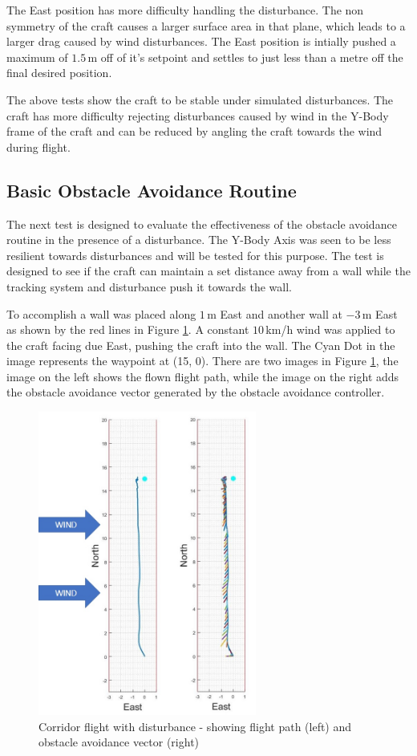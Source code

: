 		The East position has more difficulty handling the disturbance. The non symmetry of the craft causes a larger surface area in that plane, which leads to a larger drag caused by wind disturbances. The East position is intially pushed a maximum of $1.5$\,m off of it's setpoint and settles to just less than a metre off the final desired position.
		
		The above tests show the craft to be stable under simulated disturbances. The craft has more difficulty rejecting disturbances caused by wind in the Y-Body frame of the craft and can be reduced by angling the craft towards the wind during flight.
					
		\subsection{Basic Obstacle Avoidance Routine}
		The next test is designed to evaluate the effectiveness of the obstacle avoidance routine in the presence of a disturbance. The Y-Body Axis was seen to be less resilient towards disturbances and will be tested for this purpose. The test is designed to see if the craft can maintain a set distance away from a wall while the tracking system and disturbance push it towards the wall.
		
		To accomplish a wall was placed along $1$\,m East and another wall at $-3$\,m East as shown by the red lines in Figure \ref{IM_Test21}. A constant $10$\,km/h wind was applied to the craft facing due East, pushing the craft into the wall. The Cyan Dot in the image represents the waypoint at (15, 0). There are two images in Figure \ref{IM_Test21}, the image on the left shows the flown flight path, while the image on the right adds the obstacle avoidance vector generated by the obstacle avoidance controller.
		
		\begin{figure}[H]
			\centering
			\includegraphics[height = 10cm]{../References/Testing/CorridorFlight_2Wind.jpg}     
			\caption{Corridor flight with disturbance - showing flight path (left) and obstacle avoidance vector (right)}
			\label{IM_Test21}
		\end{figure}
		
